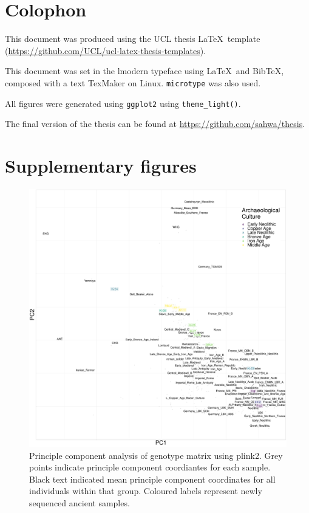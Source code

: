 \chapter{Colophon}
\label{appendixlabel3}

This document was produced using the UCL thesis \LaTeX\ template (\url{https://github.com/UCL/ucl-latex-thesis-templates}).

This document was set in the lmodern typeface using \LaTeX\ and Bib\TeX, composed with a text TexMaker on Linux. \texttt{microtype} was also used.

All figures were generated using \texttt{ggplot2} using \texttt{theme\_light()}.

The final version of the thesis can be found at \url{https://github.com/sahwa/thesis}.

\chapter{Supplementary figures}
\label{appendixlabel4}

\begin{figure}[htp]
    \centering
    \includegraphics[width=1.0\textwidth]{../images/appendix/plink_withHG_PCA.pdf}
    \caption{Principle component analysis of genotype matrix using plink2. Grey points indicate principle component coordiantes for each sample. Black text indicated mean principle component coordinates for all individuals within that group. Coloured labels represent newly sequenced ancient samples. }
    \label{fig:plink_PCA_HG}
\end{figure}

